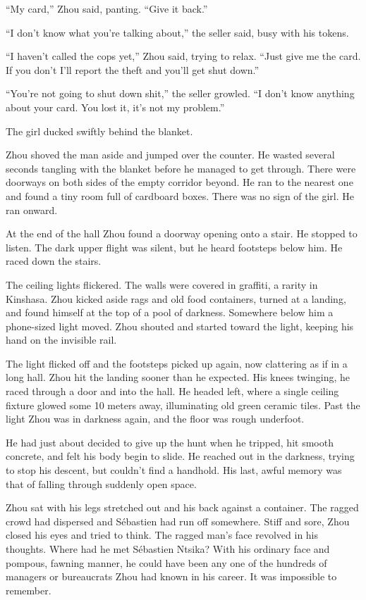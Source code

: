 \documentclass[10pt,b5paper]{article}
\begin{document}
``My card,'' Zhou said, panting. ``Give it back.''

``I don't know what you're talking about,'' the seller said, busy
with his tokens.

``I haven't called the cops yet,'' Zhou said, trying to relax.
``Just give me the card. If you don't I'll report the theft and
you'll get shut down.''

``You're not going to shut down shit,'' the seller growled. ``I don't
know anything about your card. You lost it, it's not my problem.''

The girl ducked swiftly behind the blanket.

Zhou shoved the man aside and jumped over the counter. He wasted
several seconds tangling with the blanket before he managed to get
through. There were doorways on both sides of the empty corridor
beyond. He ran to the nearest one and found a tiny room full of
cardboard boxes. There was no sign of the girl. He ran onward.

At the end of the hall Zhou found a doorway opening onto a stair. He
stopped to listen. The dark upper flight was silent, but he heard
footsteps below him. He raced down the stairs.

The ceiling lights flickered. The walls were covered in graffiti,
a rarity in Kinshasa. Zhou kicked aside rags and old food
containers, turned at a landing, and found himself at the top of
a pool of darkness. Somewhere below him a phone-sized light moved.
Zhou shouted and started toward the light, keeping his hand on the
invisible rail.

The light flicked off and the footsteps picked up again, now
clattering as if in a long hall. Zhou hit the landing sooner than he
expected. His knees twinging, he raced through a door and into the
hall. He headed left, where a single ceiling fixture glowed some
10 meters away, illuminating old green ceramic tiles. Past the
light Zhou was in darkness again, and the floor was rough underfoot.

He had just about decided to give up the hunt when he tripped,
hit smooth concrete, and felt his body begin to slide. He reached
out in the darkness, trying to stop his descent, but couldn't find
a handhold. His last, awful memory was that of falling through
suddenly open space.

\bigskip

Zhou sat with his legs stretched out and his back against a
container. The ragged crowd had dispersed and S\'{e}bastien had run
off somewhere. Stiff and sore, Zhou closed his eyes and tried to
think. The ragged man's face revolved in his thoughts. Where had he
met S\'{e}bastien Ntsika? With his ordinary face and pompous, fawning
manner, he could have been any one of the hundreds of managers
or bureaucrats Zhou had known in his career. It was impossible
to remember.
\end{document}
